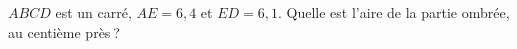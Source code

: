 \begin{question}
\begin{instance}
\begin{mcq}[standalone=true]
\begin{stem}
$ABCD$ est un carré, $AE=6{,}4$ et $ED=6{,}1$. Quelle est l'aire de la partie ombrée, au centième près ?\par
{}
\end{stem}
\begin{distractors}

\end{distractors}

\end{mcq}

\end{instance}

\end{question}
